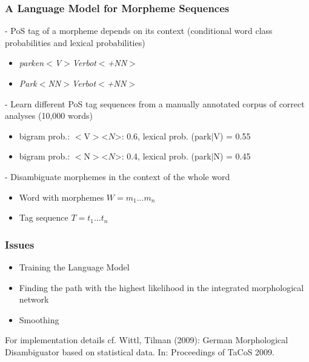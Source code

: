 \documentclass {beamer}
\begin{document}
 
 \frame
{  \frametitle{A Language Model for Morpheme Sequences}
- PoS tag of a morpheme depends on its context (conditional word class probabilities and lexical probabilities)\\
  \begin{itemize} 
  \item \textit{parken$<$V$>$Verbot$<$+NN$>$}  \\
  \item \textit{Park$<$NN$>$Verbot$<$+NN$>$}  \\
  \end{itemize}
- Learn different PoS tag sequences from a manually annotated corpus of correct analyses (10,000 words)\\
 \begin{itemize}
\item  bigram prob.: $<$V$>$<$N$>: 0.6, lexical prob. (park$|$V) = 0.55
\item  bigram prob.: $<$N$>$<$N$>: 0.4, lexical prob. (park$|$N) = 0.45
\end{itemize}
- Disambiguate morphemes in the context of the whole word\\
  \begin{itemize}
  \item Word with morphemes \begin{math} W = m_{1} ... m_{n} \end{math}
  \item Tag sequence \begin{math} T = t_{1} ... t_{n} \end{math}
    \end{itemize}
 }

\frame
{  \frametitle{Issues}
\begin{itemize} 
\item Training the Language Model
\item Finding the path with the highest likelihood in the integrated morphological network
\item Smoothing
\end{itemize}
For implementation details cf. Wittl, Tilman (2009): German Morphological Disambiguator based on statistical data. In: Proceedings of TaCoS 2009.
}
\end{document}
